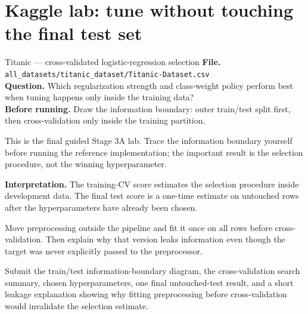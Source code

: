 \section{Kaggle lab: tune without touching the final test set}
\label{sec:kaggle-titanic-selection}

\begin{kaggleproject}{Titanic --- cross-validated logistic-regression selection}
\textbf{File.} \texttt{all\_datasets/titanic\_dataset/Titanic-Dataset.csv}\\
\textbf{Question.} Which regularization strength and class-weight policy perform best when tuning happens only inside the training data?\\
\textbf{Before running.} Draw the information boundary: outer train/test split first, then cross-validation only inside the training partition.

\begin{labmode}
This is the final guided Stage 3A lab. Trace the information boundary yourself before running the reference implementation; the important result is the selection procedure, not the winning hyperparameter.
\end{labmode}



\textbf{Interpretation.} The training-CV score estimates the selection procedure inside development data. The final test score is a one-time estimate on untouched rows after the hyperparameters have already been chosen.

\begin{debugtask}
Move preprocessing outside the pipeline and fit it once on all rows before cross-validation. Then explain why that version leaks information even though the target was never explicitly passed to the preprocessor.
\end{debugtask}
\end{kaggleproject}

\begin{labdeliverable}
Submit the train/test information-boundary diagram, the cross-validation search summary, chosen hyperparameters, one final untouched-test result, and a short leakage explanation showing why fitting preprocessing before cross-validation would invalidate the selection estimate.
\end{labdeliverable}

